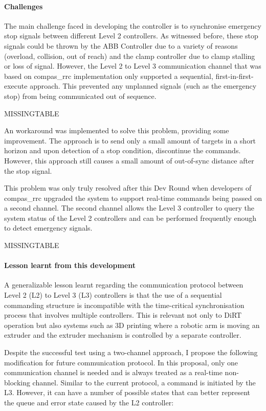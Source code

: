 \paragraph{Challenges}

The main challenge faced in developing the controller is to synchronise emergency stop signals between different Level 2 controllers. As witnessed before, these stop signals could be thrown by the ABB Controller due to a variety of reasons (overload, collision, out of reach) and the clamp controller due to clamp stalling or loss of signal. However, the Level 2 to Level 3 communication channel that was based on compas\_rrc implementation only supported a sequential, first-in-first-execute approach. This prevented any unplanned signals (such as the emergency stop) from being communicated out of sequence.

MISSINGTABLE

An workaround was implemented to solve this problem, providing some improvement. The approach is to send only a small amount of targets in a short horizon and upon detection of a stop condition, discontinue the commands. However, this approach still causes a small amount of out-of-sync distance after the stop signal. 

This problem was only truly resolved after this Dev Round when developers of compas\_rrc upgraded the system to support real-time commands being passed on a second channel. The second channel allows the Level 3 controller to query the system status of the Level 2 controllers and can be performed frequently enough to detect emergency signals.

MISSINGTABLE

\paragraph{Lesson learnt from this development}

A generalizable lesson learnt regarding the communication protocol between Level 2 (L2) to Level 3 (L3) controllers is that the use of a sequential commanding structure is incompatible with the time-critical synchronisation process that involves multiple controllers. This is relevant not only to DiRT operation but also systems such as 3D printing where a robotic arm is moving an extruder and the extruder mechanism is controlled by a separate controller.

Despite the successful test using a two-channel approach, I propose the following modification for future communication protocol. In this proposal, only one communication channel is needed and is always treated as a real-time non-blocking channel. Similar to the current protocol, a command is initiated by the L3. However, it can have a number of possible states that can better represent the queue and error state caused by the L2 controller:

